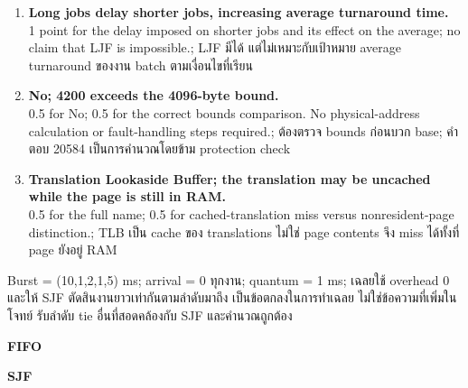 \begin{enumerate}[leftmargin=1.4em,start=6,itemsep=.25cm]
\item \textbf{Long jobs delay shorter jobs, increasing average turnaround time.}\\1 point for the delay imposed on shorter jobs and its effect on the average; no claim that LJF is impossible.; LJF มีได้ แต่ไม่เหมาะกับเป้าหมาย average turnaround ของงาน batch ตามเงื่อนไขที่เรียน
\item \textbf{No; 4200 exceeds the 4096-byte bound.}\\0.5 for No; 0.5 for the correct bounds comparison. No physical-address calculation or fault-handling steps required.; ต้องตรวจ bounds ก่อนบวก base; คำตอบ 20584 เป็นการคำนวณโดยข้าม protection check
\item \textbf{Translation Lookaside Buffer; the translation may be uncached while the page is still in RAM.}\\0.5 for the full name; 0.5 for cached-translation miss versus nonresident-page distinction.; TLB เป็น cache ของ translations ไม่ใช่ page contents จึง miss ได้ทั้งที่ page ยังอยู่ RAM
\end{enumerate}\newpage{}
\noindent Burst = (10,1,2,1,5) ms; arrival = 0 ทุกงาน; quantum = 1 ms; เฉลยใช้ overhead 0 และให้ SJF ตัดสินงานยาวเท่ากันตามลำดับมาถึง เป็นข้อตกลงในการทำเฉลย ไม่ใช่ข้อความที่เพิ่มในโจทย์ รับลำดับ tie อื่นที่สอดคล้องกับ SJF และคำนวณถูกต้อง\par
\noindent\textbf{FIFO}
\begin{center}\end{center}
\noindent\textbf{SJF}
\begin{center}\end{center}
